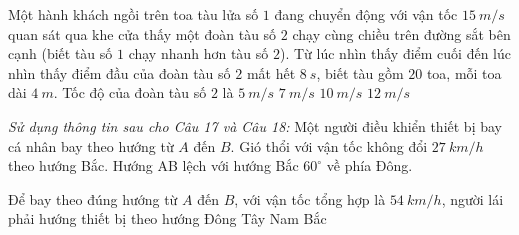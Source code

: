 \begin{ex}%
Một hành khách ngồi trên toa tàu lửa số $1$ đang chuyển động với vận tốc $15\ m/s$ quan sát qua khe cửa thấy một đoàn tàu số $2$ chạy cùng chiều trên đường sắt bên cạnh (biết tàu số $1$ chạy nhanh hơn tàu số $2$). Từ lúc nhìn thấy điểm cuối đến lúc nhìn thấy điểm đầu của đoàn tàu số $2$ mất hết $8\ s$, biết tàu gồm $20$ toa, mỗi toa dài $4\ m$. Tốc độ của đoàn tàu số $2$ là
\choice
{\True $5 \ m/s$}
{$7 \ m/s$}
{$10 \ m/s$}
{$12 \ m/s$}
\loigiai{}
\end{ex}
\textit{Sử dụng thông tin sau cho Câu 17 và Câu 18:} Một người điều khiển thiết bị bay cá nhân bay theo hướng từ $A$ đến $B$. Gió thổi với vận tốc không đổi $27\ km/h$ theo hướng Bắc. Hướng AB lệch với hướng Bắc $60^\circ$ về phía Đông. 
\begin{ex}%
Để bay theo đúng hướng từ $A$ đến $B$, với vận tốc tổng hợp là $54\  km/h$, người lái phải hướng thiết bị theo hướng
\choice
{\True Đông}
{Tây}
{Nam}
{Bắc}
\loigiai{}
\end{ex}

